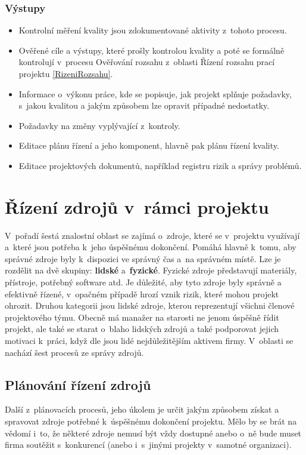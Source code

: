 \subsubsection*{Výstupy}
\begin{itemize}
    \item Kontrolní měření kvality jsou zdokumentované aktivity z~tohoto procesu.  
    \item Ověřené cíle a výstupy, které prošly kontrolou kvality a poté se formálně kontrolují v~procesu Ověřování rozsahu z~oblasti Řízení rozsahu prací projektu \ref{RizeniRozsahu}.
    \item Informace o~výkonu práce, kde se popisuje, jak projekt splňuje požadavky, s~jakou kvalitou a jakým způsobem lze opravit případné nedostatky.
    \item Požadavky na změny vyplývající z~kontroly.
    \item Editace plánu řízení a jeho komponent, hlavně pak plánu řízení kvality.
    \item Editace projektových dokumentů, například registru rizik a správy problémů.
\end{itemize}

\section{Řízení zdrojů v~rámci projektu}

V~pořadí šestá znalostní oblast se zajímá o~zdroje, které se v~projektu využívají a~které jsou potřeba k~jeho úspěšnému dokončení. Pomáhá hlavně k~tomu, aby správné zdroje byly k~dispozici ve správný čas a~na správném místě. Lze je rozdělit na dvě skupiny: \textbf{lidské} a~\textbf{fyzické}. Fyzické zdroje představují materiály, přístroje, potřebný software atd. Je důležité, aby tyto zdroje byly správně a efektivně řízené, v~opačném případě hrozí vznik rizik, které mohou projekt ohrozit. Druhou kategorii jsou lidské zdroje, kterou reprezentují všichni členové projektového týmu. Obecně má manažer na starosti ne jenom úspěšně řídit projekt, ale také se starat o~blaho lidských zdrojů a také podporovat jejich motivaci k~práci, když dle \cite{StrategieRizeni} jsou lidé nejdůležitějším aktivem firmy. V~oblasti se nachází šest procesů ze správy zdrojů.


\subsection*{Plánování řízení zdrojů}

Další z~plánovacích procesů, jeho úkolem je určit jakým způsobem získat a spravovat zdroje potřebné k~úspěšnému dokončení projektu. Mělo by se brát na vědomí i~to, že některé zdroje nemusí být vždy dostupné anebo o~ně bude muset firma soutěžit s~konkurencí (anebo i~s~jinými projekty v~samotné organizaci).

